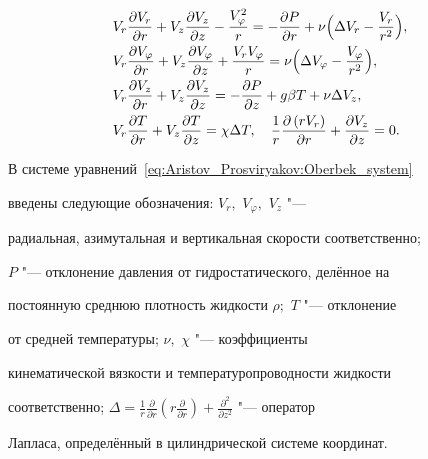 \begin{equation}

\label{eq:Aristov_Prosviryakov:Oberbek_system}

\begin{aligned}

&V_r \frac{\partial V_r}{\partial r} + V_z \frac{\partial V_z}{\partial z}-\frac{V^2_{\varphi}}{r}=-\frac{\partial P}{\partial r}+\nu\Bigl(  \Delta V_{r}-\frac{V_{r}}{r^2}\Bigr),\\

&V_r \frac{\partial V_{\varphi}}{\partial r} + V_z \frac{\partial V_{\varphi}}{\partial z}+\frac{V_{r}V_{\varphi}}{r}= \nu\Bigl(  \Delta V_{\varphi}-\frac{V_{\varphi}}{r^2}\Bigr),\\

&V_r \frac{\partial V_z}{\partial r} + V_z \frac{\partial V_z}{\partial z}=- \frac{\partial P}{\partial z} + g\beta T + \nu \Delta V_z,\\

&V_r \frac{\partial T}{\partial r} + V_z \frac{\partial T}{\partial z}=\chi \Delta T,\quad \frac{1}{r}\frac{\partial \left(r V_r\right) }{\partial

r}+\frac{\partial V_z}{\partial z}=0.

\end{aligned}

\end{equation}

В системе уравнений~\eqref{eq:Aristov_Prosviryakov:Oberbek_system}

введены следующие обозначения: $V_r,$ $V_{\varphi},$ $V_z $  "---

радиальная, азимутальная и вертикальная скорости соответственно;

$P$ "--- отклонение давления от гидростатического, делённое на

постоянную среднюю плотность жидкости $\rho;$  $T$ "--- отклонение

от средней температуры; $\nu,$ $\chi$ "--- коэффициенты

кинематической вязкости и температуропроводности жидкости

соответственно; $\Delta=\frac{1}{r}\frac{\partial

}{\partial r}\left( r\frac{\partial}{\partial

r}\right)+\frac{\partial^2 }{\partial z^2} $ "--- оператор

Лапласа, определённый в цилиндрической системе координат.



